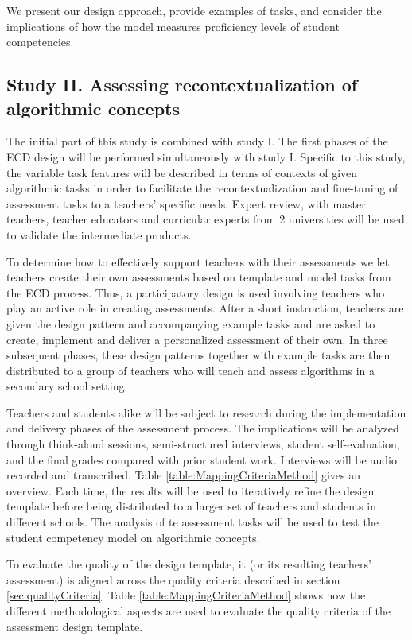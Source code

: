 We present our design approach, provide examples of tasks, and consider the implications of how the model measures proficiency levels of student competencies.


\subsection{Study II. Assessing recontextualization of algorithmic concepts} %

The initial part of this study is combined with study I. The first phases of the ECD design will be performed simultaneously with study I. Specific to this study, the variable task features will be described in terms of contexts of given algorithmic tasks in order to facilitate the recontextualization and fine-tuning of assessment tasks to a teachers' specific needs. Expert review, with master teachers, teacher educators and curricular experts from 2 universities will be used to validate the intermediate products.



To determine how to effectively support teachers with their assessments we let teachers create their own assessments based on template and model tasks from the ECD process. Thus, a participatory design is used involving teachers who play an active role in creating assessments. After a short instruction, teachers are given the design pattern and accompanying example tasks and are asked to create, implement and deliver a personalized assessment of their own. In three subsequent phases, these design patterns together with example tasks are then distributed to a group of teachers who will teach and assess algorithms in a secondary school setting.


Teachers and students alike will be subject to research during the implementation and delivery phases of the assessment process. The implications will be analyzed through think-aloud sessions, semi-structured interviews, student self-evaluation, and the final grades compared with prior student work. Interviews will be audio recorded and transcribed. Table \ref{table:MappingCriteriaMethod} gives an overview. Each time, the results will be used to iteratively refine the design template before being distributed to a larger set of teachers and students in different schools. The analysis of te assessment tasks will be used to test the student competency model on algorithmic concepts.


To evaluate the quality of the design template, it (or its resulting teachers' assessment) is aligned across the quality criteria described in section \ref{sec:qualityCriteria}. Table \ref{table:MappingCriteriaMethod} shows how the different methodological aspects are used to evaluate the quality criteria of the assessment design template.

